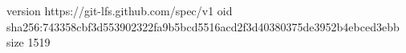 version https://git-lfs.github.com/spec/v1
oid sha256:743358cbf3d553902322fa9b5bcd5516acd2f3d40380375de3952b4ebced3ebb
size 1519
